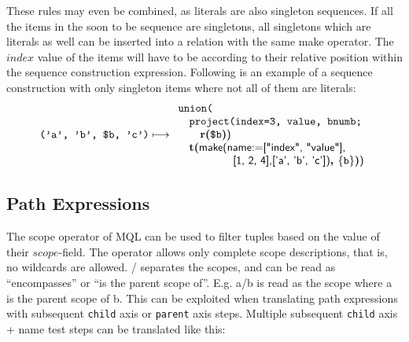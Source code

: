 These rules may even be combined, as literals are also singleton sequences. If all the items in the soon to 
be sequence are singletons, all singletons which are literals as well can be inserted into a relation with
the same \textsf{make} operator. The $index$ value of the items will have to be according to their relative 
position within the sequence construction expression. Following is an example of a sequence construction with
only singleton items where not all of them are literals:
\begin{equation*}
\mbox{\texttt{('a', 'b', \$b, 'c')}}\longmapsto
\begin{array}{l}
\mbox{\texttt{union(}} \\ \quad
\mbox{\texttt{project(index=3, value, bnumb;}} \\ \quad \quad
\mbox{\textbf{r(}}\texttt{\$b}\mbox{\textbf{)}\textsf{)}} \\ \quad
\mbox{\textbf{t(}}
\mbox{\textsf{make(name:=["index", "value"],}} \\ \quad \quad \quad \quad \quad 
\mbox{\textsf{[1, 2, 4],['a', 'b', 'c'])}\textbf{,
}}\{\mbox{\texttt{b}}\}\mbox{\textbf{)}\textsf{)}}
\end{array}
\end{equation*}
      

\subsection{Path Expressions}
\label{sect:trans:TD:simpl:pathExpr}
The \textsf{scope} operator of MQL can be used to filter tuples based on the value of their $scope$-field. The
operator allows only complete scope descriptions, that is, no wildcards are allowed. \textsf{/} separates the
scopes, and can be read as ``encompasses'' or ``is the parent scope of''. E.g. \textsf{a/b} is read as the scope
where \textsf{a} is the parent scope of \textsf{b}. This can be exploited when translating path expressions with
subsequent \texttt{child} axis or \texttt{parent} axis steps. Multiple subsequent \texttt{child} axis + name test
steps can be translated like this:

